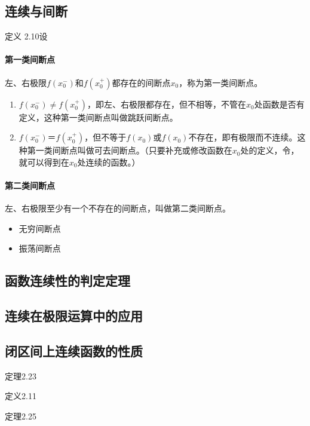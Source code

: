 \subsection{连续与间断}
定义 2.10\quad 设

\paragraph{第一类间断点}
左、右极限$f(x_0^-)$和$f(x_0^+)$都存在的间断点$x_0$，称为第一类间断点。
\begin{enumerate}
    \item $f(x_0^-)\neq f(x_0^+)$，即左、右极限都存在，但不相等，不管在$x_0$处函数是否有定义，这种第一类间断点叫做跳跃间断点。
    \item $f(x_0^-)＝f(x_0^+)$，但不等于$f(x_0)$或$f(x_0)$不存在，即有极限而不连续。这种第一类间断点叫做可去间断点。（只要补充或修改函数在$x_0$处的定义，令，就可以得到在$x_0$处连续的函数。）
\end{enumerate}

\paragraph{第二类间断点}
左、右极限至少有一个不存在的间断点，叫做第二类间断点。
\begin{itemize}
    \item 无穷间断点
    \item 振荡间断点
\end{itemize}

\subsection{函数连续性的判定定理}

\subsection{连续在极限运算中的应用}

\subsection{闭区间上连续函数的性质}
定理2.23

定义2.11

定理2.25